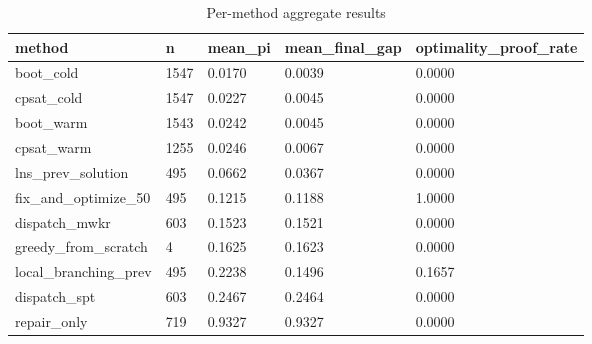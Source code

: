 \begin{table}[t]
\centering
\begin{tabular}{lllll}
\toprule
method & n & mean\_pi & mean\_final\_gap & optimality\_proof\_rate \\
\midrule
boot\_cold & 1547 & 0.0170 & 0.0039 & 0.0000 \\
cpsat\_cold & 1547 & 0.0227 & 0.0045 & 0.0000 \\
boot\_warm & 1543 & 0.0242 & 0.0045 & 0.0000 \\
cpsat\_warm & 1255 & 0.0246 & 0.0067 & 0.0000 \\
lns\_prev\_solution & 495 & 0.0662 & 0.0367 & 0.0000 \\
fix\_and\_optimize\_50 & 495 & 0.1215 & 0.1188 & 1.0000 \\
dispatch\_mwkr & 603 & 0.1523 & 0.1521 & 0.0000 \\
greedy\_from\_scratch & 4 & 0.1625 & 0.1623 & 0.0000 \\
local\_branching\_prev & 495 & 0.2238 & 0.1496 & 0.1657 \\
dispatch\_spt & 603 & 0.2467 & 0.2464 & 0.0000 \\
repair\_only & 719 & 0.9327 & 0.9327 & 0.0000 \\
\bottomrule
\end{tabular}
\caption{Per-method aggregate results}
\label{tab:main-jssp}
\end{table}
